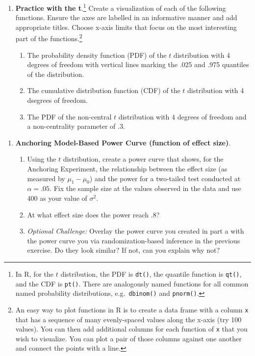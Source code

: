 \documentclass[
  letterpaper,
  DIV=11,
  numbers=noendperiod]{scrartcl}
\providecommand{\tightlist}{%
  \setlength{\itemsep}{0pt}\setlength{\parskip}{0pt}}
\begin{document}
\begin{enumerate}
\def\labelenumi{\arabic{enumi}.}
\setcounter{enumi}{4}
\item
  \textbf{Practice with the t}.\footnote{In R, for the \(t\)
    distribution, the PDF is \texttt{dt()}, the quantile function is
    \texttt{qt()}, and the CDF is \texttt{pt()}. There are analogously
    named functions for all common named probability distributions,
    e.g.~\texttt{dbinom()} and \texttt{pnorm()}.} Create a visualization
  of each of the following functions. Ensure the axes are labelled in an
  informative manner and add appropriate titles. Choose x-axis limits
  that focus on the most interesting part of the functions.\footnote{An
    easy way to plot functions in R is to create a data frame with a
    column \texttt{x} that has a sequence of many evenly-spaced values
    along the x-axis (try 100 values). You can then add additional
    columns for each function of \texttt{x} that you wish to visualize.
    You can plot a pair of those columns against one another and connect
    the points with a line.}

  \begin{enumerate}
  \def\labelenumii{\alph{enumii}.}
  \tightlist
  \item
    The probability density function (PDF) of the \(t\) distribution
    with 4 degrees of freedom with vertical lines marking the .025 and
    .975 quantiles of the distribution.
  \item
    The cumulative distribution function (CDF) of the \(t\) distribution
    with 4 dsegrees of freedom.
  \item
    The PDF of the non-central \(t\) distribution with 4 degrees of
    freedom and a non-centrality parameter of .3.
  \end{enumerate}
\end{enumerate}

\begin{enumerate}
\def\labelenumi{\arabic{enumi}.}
\setcounter{enumi}{5}
\item
  \textbf{Anchoring Model-Based Power Curve (function of effect size)}.

  \begin{enumerate}
  \def\labelenumii{\alph{enumii}.}
  \item
    Using the \(t\) distribution, create a power curve that shows, for
    the Anchoring Experiment, the relationship between the effect size
    (as measured by \(\mu_1 - \mu_0\)) and the power for a two-tailed
    test conducted at \(\alpha = .05\). Fix the sample size at the
    values observed in the data and use 400 as your value of
    \(\sigma^2\).
  \item
    At what effect size does the power reach .8?
  \item
    \emph{Optional Challenge:} Overlay the power curve you created in
    part a with the power curve you via randomization-based inference in
    the previous exercise. Do they look similar? If not, can you explain
    why not?
  \end{enumerate}
\end{enumerate}
\end{document}
